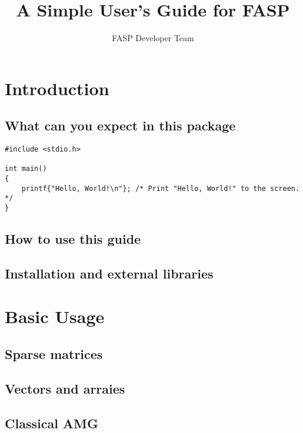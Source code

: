 \documentclass[11pt]{memoir}
\title{A Simple User's Guide for FASP}
\author{FASP Developer Team}
\begin{document}
\maketitle

\newpage
\tableofcontents

\chapter{Introduction}\label{ch:intro}

\section{What can you expect in this package}

\begin{lstlisting}
#include <stdio.h>

int main()
{
	printf{"Hello, World!\n"}; /* Print "Hello, World!" to the screen. */
}
\end{lstlisting}

\section{How to use this guide}

\section{Installation and external libraries}

\chapter{Basic Usage}\label{ch:basic}

\section{Sparse matrices}

\section{Vectors and arraies}

\section{Classical AMG}
\end{document}
